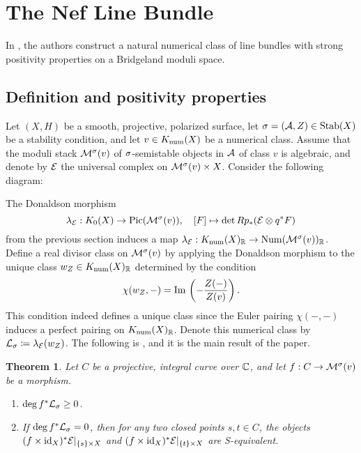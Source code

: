 \documentclass[letterpaper,11pt]{amsart}%
\newtheorem{thm}{Theorem}[section]
\theoremstyle{remark}
\begin{document}

\section{The Nef Line Bundle}
In \cite{BM}, the authors construct a natural numerical class of line bundles with strong positivity properties on a Bridgeland moduli space. 

\subsection{Definition and positivity properties}\label{positiveLBdefandprops}
Let $(X,H)$ be a smooth, projective, polarized surface, let $\sigma = (\mathcal{A}, Z) \in \operatorname{\mathrm{Stab}}(X)$ be a stability condition, and let $v \in K_{\mathrm{num}}(X)$ be a numerical class. Assume that the moduli stack $\mathcal{M}^\sigma(v)$ of $\sigma$-semistable objects in $\mathcal{A}$ of class $v$ is algebraic, and denote by $\mathcal{E}$ the universal complex on $\mathcal{M}^\sigma(v) \times X$. Consider the following diagram:
\begin{center}
\end{center}
The Donaldson morphism
\[ \lambda_{\mathcal{E}}: K_0(X) \to \mathrm{Pic}(\mathcal{M}^\sigma(v)), \quad [F] \mapsto \det R p_*(\mathcal{E} \otimes q^* F) \]
from the previous section induces a map $\lambda_{\mathcal{E}}: K_{\mathrm{num}}(X)_{\mathbb{R}} \to \mathrm{Num}(\mathcal{M}^\sigma(v))_{\mathbb{R}}$. Define a real divisor class on $\mathcal{M}^\sigma(v)$ by applying the Donaldson morphism to the unique class $w_Z \in K_{\mathrm{num}}(X)_{\mathbb{R}}$ determined by the condition
\[ \chi(w_Z, -) = \mathrm{Im}\,\left(-\frac{Z(-)}{Z(v)}\right). \]
This condition indeed defines a unique class since the Euler pairing $\chi(-,-)$ induces a perfect pairing on $K_{\mathrm{num}}(X)_{\mathbb{R}}$. Denote this numerical class by $\mathcal{L}_\sigma \coloneqq \lambda_{\mathcal{E}}(w_Z)$. The following is \cite[Lemma 3.3]{BM}, and it is the main result of the paper.
\begin{thm}\label{BMpositivity}
    Let $C$ be a projective, integral curve over $\mathbb{C}$, and let $f: C \to \mathcal{M}^\sigma(v)$ be a morphism.
    \begin{enumerate}[(1)]
        \item $\deg f^* \mathcal{L}_\sigma \ge 0$.
        \item If $\deg f^* \mathcal{L}_\sigma = 0$, then for any two closed points $s, t \in C$, the objects \\ $(f \times \mathrm{id}_X)^*\mathcal{E}|_{\{s\} \times X}$ and $(f\times \mathrm{id}_X)^*\mathcal{E}|_{\{t\} \times X}$ are S-equivalent.
    \end{enumerate}
\end{thm}
\end{document}
